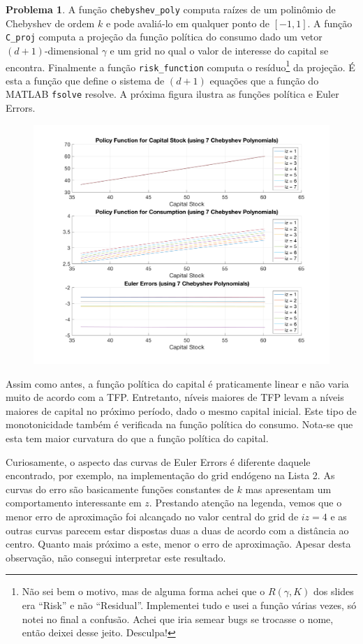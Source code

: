 \documentclass[11pt]{article}
\theoremstyle{definition}
\newtheorem{prob}{Problema}
\theoremstyle{solution}
\begin{document}
\begin{prob}
	A função \texttt{chebyshev\_poly} computa raízes de um polinômio de Chebyshev de ordem $k$ e pode avaliá-lo em qualquer ponto de $[-1,1]$. A função \texttt{C\_proj} computa a projeção da função política do consumo dado um vetor $(d+1)$-dimensional $\gamma$ e um grid no qual o valor de interesse do capital se encontra. Finalmente a função \texttt{risk\_function} computa o resíduo\footnote{Não sei bem o motivo, mas de alguma forma achei que o $R(\gamma, K)$ dos slides era ``Risk'' e não ``Residual''. Implementei tudo e usei a função várias vezes, só notei no final a confusão. Achei que iria semear bugs se trocasse o nome, então deixei desse jeito. Desculpa!} da projeção. É esta a função que define o sistema de $(d+1)$ equações que a função do MATLAB \texttt{fsolve} resolve. A próxima figura ilustra as funções política e Euler Errors.
	\begin{figure}[h!]
		\centering
		\includegraphics[scale=0.25]{item1.png}
	\end{figure}
	
	Assim como antes, a função política do capital é praticamente linear e não varia muito de acordo com a TFP. Entretanto, níveis maiores de TFP levam a níveis maiores de capital no próximo período, dado o mesmo capital inicial. Este tipo de monotonicidade também é verificada na função política do consumo. Nota-se que esta tem maior curvatura do que a função política do capital.
	
	Curiosamente, o aspecto das curvas de Euler Errors é diferente daquele encontrado, por exemplo, na implementação do grid endógeno na Lista 2. As curvas do erro são basicamente funções constantes de $k$ mas apresentam um comportamento interessante em $z$. Prestando atenção na legenda, vemos que o menor erro de aproximação foi alcançado no valor central do grid de $iz = 4$ e as outras curvas parecem estar dispostas duas a duas de acordo com a distância ao centro. Quanto mais próximo a este, menor o erro de aproximação. Apesar desta observação, não consegui interpretar este resultado.
\end{prob}
\end{document}
